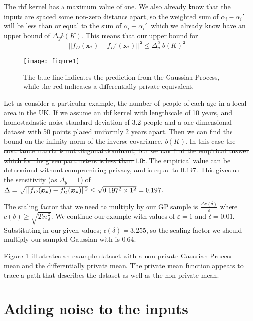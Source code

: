 \documentclass[a4paper]{article}
\begin{document}
\begin{multicols}{2}
The rbf kernel has a maximum value of one. We also already know that the inputs are spaced some non-zero distance apart, so the weighted sum of $\alpha_i-\alpha_i'$ will be less than or equal to the sum of $\alpha_i - \alpha_i'$, which we already know have an upper bound of $\Delta_y b(K)$. This means that our upper bound for 
\begin{dmath}
||f_D(\bm{x_*}) - f_D'(\bm{x_*})||^2  \leq \Delta_y^2 \; b(K)^2
\label{norm_squared_2}
\end{dmath}

\begin{figure}[H]
  \centering
    \texttt{[image: figure1]}
  \caption{The blue line indicates the prediction from the Gaussian Process, while the red indicates a differentially private equivalent.}  
  \label{figure1}
\end{figure}

Let us consider a particular example, the number of people of each age in a local area in the UK. If we assume an rbf kernel with lengthscale of 10 years, and homostadastic noise standard deviation of 3.2 people and a one dimensional dataset with 50 points placed uniformly 2 years apart. Then we can find the bound on the infinity-norm of the inverse covariance, $b(K)$. \sout{In this case the covariance matrix is not diagonal dominant, but we can find the empirical answer which for the given parameters is less than $1.0$.}. The empirical value can be determined without compromising privacy, and is equal to 0.197. This gives us the sensitivity (as $\Delta_y=1$) of $\Delta = \sqrt{||f_D(\bm{x_*}) - f_D'(\bm{x_*})||^2} \leq \\ \sqrt{0.197^2 \times 1^2} = 0.197$. 

The scaling factor that we need to multiply by our GP sample is $\frac{\Delta c(\delta)}{\varepsilon}$ where $c(\delta) \geq \sqrt{2 ln \frac{2}{\delta}}$. We continue our example with values of $\varepsilon=1$ and $\delta=0.01$. Substituting in our given values; $c(\delta) = 3.255$, so the scaling factor we should multiply our sampled Gaussian with is $0.64$.

Figure \ref{figure1} illustrates an example dataset with a non-private Gaussian Process mean and the differentially private mean. The private mean function appears to trace a path that describes the dataset as well as the non-private mean.

\section{Adding noise to the inputs}


\end{multicols}
\end{document}
